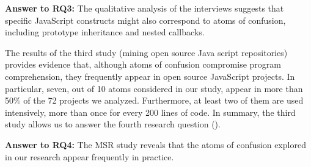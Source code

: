 \begin{mh}
  {\bf Answer to RQ3:} The qualitative analysis of the
  interviews suggests that specific JavaScript constructs might also correspond to atoms of
  confusion, including prototype inheritance and
  nested callbacks. 
\end{mh}

The results of the third study (mining open source
Java script repositories) provides evidence that,
although atoms of confusion compromise program
comprehension, they frequently appear in open
source JavaScript projects. In particular,
seven, out of 10 atoms considered
  in our study, appear in more than 50\% of
the 72 projects we analyzed. Furthermore, at least two of them are used intensively, more than once for every 200 lines of code. In summary, the third study
allows us to answer the fourth research
question (\emph{\rqd}).


\begin{mh}
  {\bf Answer to RQ4:} The MSR study reveals that
  the atoms of confusion explored in our research
  appear frequently in practice. 
\end{mh}






